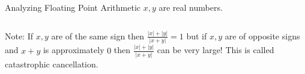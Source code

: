 \documentclass{article}
\begin{document}
Analyzing Floating Point Arithmetic
$x,y$ are real numbers.

\begin{equation*} %
	
\end{equation*}

Note: If $x,y$ are of the same sign then $\frac{|x| + |y|}{|x+y|} = 1$ but if $x,y$ are of opposite signs and $x+y$ is approximately $0$ then $\frac{|x| + |y|}{|x+y|}$ can be very large! This is called catastrophic cancellation.
\end{document}
